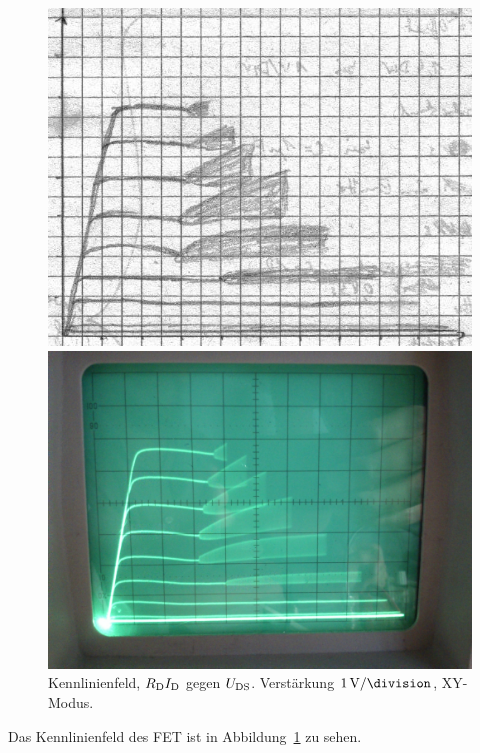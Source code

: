 \begin{figure}
	\centering
	\label{fig:4}
	\begin{minipage}{0.45\linewidth}
		\includegraphics[width=\linewidth]{Oszi_Hand/3-04.jpg}
	\end{minipage}
	\hfill
	\begin{minipage}{.45\linewidth}
		\includegraphics[width=\linewidth]{Oszi_Foto/3-04.jpg}
	\end{minipage}
	\caption{%
		Kennlinienfeld, $R_\text{D} I_\text{D}$ gegen $U_\text{DS}$. Verstärkung $\SI
		1{\volt\per\division}$, XY-Modus.
	}
	\label{fig:4}
\end{figure}

Das Kennlinienfeld des FET ist in Abbildung~\ref{fig:4} zu sehen.

